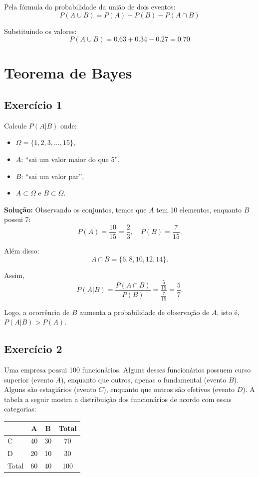 \documentclass{article}
\begin{document}
Pela fórmula da probabilidade da união de dois eventos:
    $$
    P(A \cup B) = P(A) + P(B) - P(A \cap B)
    $$

Substituindo os valores:
    $$
    P(A \cup B) = 0.63 + 0.34 - 0.27 = 0.70
    $$

\section{Teorema de Bayes}
\subsection{Exercício 1}
Calcule $P(A|B)$ onde:

\begin{itemize}
    \item $\Omega = \{1,2,3,\ldots,15\}$,
    \item $A$: ``sai um valor maior do que 5'',
    \item $B$: ``sai um valor par'',
    \item $A \subset \Omega$ e $B \subset \Omega$.
\end{itemize}

\vspace{0.5cm}
\textbf{Solução:}
Observando os conjuntos, temos que $A$ tem 10 elementos, enquanto $B$ possui 7:
    $$
    P(A) = \frac{10}{15} = \frac{2}{3}, 
    \quad
    P(B) = \frac{7}{15}.
    $$

Além disso:
    $$
    A \cap B = \{6,8,10,12,14\}.
    $$

Assim,
    $$
    P(A|B) = \frac{P(A \cap B)}{P(B)} 
    = \frac{\tfrac{5}{15}}{\tfrac{7}{15}} 
    = \frac{5}{7}.
    $$

Logo, a ocorrência de $B$ aumenta a probabilidade de observação de $A$, isto é, $P(A|B) > P(A)$.

\subsection{Exercício 2}
Uma empresa possui 100 funcionários. Alguns desses funcionários possuem curso superior (evento $A$), enquanto que outros, apenas o fundamental (evento $B$). Alguns são estagiários (evento $C$), enquanto que outros são efetivos (evento $D$). A tabela a seguir mostra a distribuição dos funcionários de acordo com essas categorias:

\vspace{0.5cm}
\begin{center}
\begin{tabular}{lccc}
\hline
 & A & B & Total \\
\hline
C & 40 & 30 & 70 \\
D & 20 & 10 & 30 \\
\hline
Total & 60 & 40 & 100 \\
\hline
\end{tabular}
\end{center}
\end{document}
